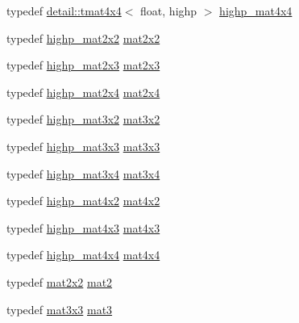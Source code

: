 \begin{DoxyCompactItemize}
\item 
typedef \hyperlink{structglm_1_1detail_1_1tmat4x4}{detail\+::tmat4x4}$<$ float, highp $>$ \hyperlink{group__core__precision_ga231950d260be295a25d7340e2020f55c}{highp\+\_\+mat4x4}
\item 
typedef \hyperlink{group__core__precision_ga694146b8d430b22caa8b37571d9bc8bc}{highp\+\_\+mat2x2} \hyperlink{group__core__types_gaeddc14adb4963d9bad73866cc202fb40}{mat2x2}
\item 
typedef \hyperlink{group__core__precision_ga7d4e5a1c803be5688c75241c924dfa58}{highp\+\_\+mat2x3} \hyperlink{group__core__types_gaea02797b8231f6dd9380345f6ff12155}{mat2x3}
\item 
typedef \hyperlink{group__core__precision_ga3cc506666b7a95db56f9d2eb787b6e20}{highp\+\_\+mat2x4} \hyperlink{group__core__types_gaa9bfb36efaf88ecad32369ec8a01d901}{mat2x4}
\item 
typedef \hyperlink{group__core__precision_gabc7767293ff69cd56717ee9d8be62963}{highp\+\_\+mat3x2} \hyperlink{group__core__types_gad7476e0e866186f12ee87975c6b01552}{mat3x2}
\item 
typedef \hyperlink{group__core__precision_ga8a3703cc71cdfc8928eddf46b3763c4b}{highp\+\_\+mat3x3} \hyperlink{group__core__types_ga6fecca6a869070b6bf8acb44ce1c2af3}{mat3x3}
\item 
typedef \hyperlink{group__core__precision_gabaf9c8dd35db715b1093042703f879d0}{highp\+\_\+mat3x4} \hyperlink{group__core__types_ga5524ae15d7fc00a68b8e0e3a0733cc2a}{mat3x4}
\item 
typedef \hyperlink{group__core__precision_gadf9c4a7947c2b0a79f52cc86a860f270}{highp\+\_\+mat4x2} \hyperlink{group__core__types_ga72cf8ec4f4cda85943f4683531e421bc}{mat4x2}
\item 
typedef \hyperlink{group__core__precision_gab8dfe989c5100c35ab5dec0e94f59d2a}{highp\+\_\+mat4x3} \hyperlink{group__core__types_gad3f3f750dcdc74a9037342c5cae55f5e}{mat4x3}
\item 
typedef \hyperlink{group__core__precision_ga231950d260be295a25d7340e2020f55c}{highp\+\_\+mat4x4} \hyperlink{group__core__types_ga63e3ee9447ed593484140a9368e738ec}{mat4x4}
\item 
typedef \hyperlink{group__core__types_gaeddc14adb4963d9bad73866cc202fb40}{mat2x2} \hyperlink{group__core__types_ga8357ec0aab6f8cf69313592492663c3f}{mat2}
\item 
typedef \hyperlink{group__core__types_ga6fecca6a869070b6bf8acb44ce1c2af3}{mat3x3} \hyperlink{group__core__types_gadfaff2a7dce5cbf4e77a47ecea42ac5b}{mat3}
\item 

\end{DoxyCompactItemize}
